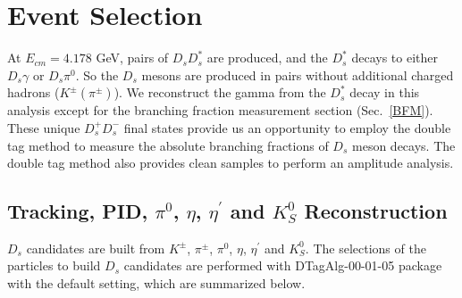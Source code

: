 \section{Event Selection}
\label{ST-selection}
At $E_{cm} = 4.178$ GeV, pairs of $D_{s}D_{s}^{*}$ are produced,  and the $D_{s}^{*}$ decays to either $D_{s}\gamma$ or $D_{s}\pi^{0}$.
So the $D_{s}$ mesons are produced in pairs without additional charged hadrons ($K^{\pm}(\pi^{\pm})$).
We reconstruct the gamma from the $D_{s}^{*}$ decay in this analysis except for the branching fraction measurement section (Sec.~\ref{BFM}). 
These unique $D_{s}^{+}D_{s}^{-}$ final states provide us an opportunity to employ the double tag method to measure the absolute branching fractions of $D_{s}$ meson decays.
The double tag method also provides clean samples to perform an amplitude analysis.


\subsection{Tracking, PID, $\pi^{0}$, $\eta$, $\eta^{'}$ and $K_{S}^{0}$ Reconstruction }
$D_{s}$ candidates are built from $K^{\pm}$, $\pi^{\pm}$, $\pi^{0}$, $\eta$, $\eta^{'}$ and $K_{S}^{0}$. The selections of the particles to build $D_{s}$ candidates are performed with DTagAlg-00-01-05 package with the default setting, which are summarized below.

